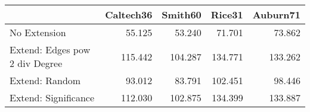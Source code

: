 \begin{tabular}{lrrrr}
\toprule
{} & Caltech36 & Smith60 &  Rice31 & Auburn71 \\
\midrule
No Extension                   &    55.125 &  53.240 &  71.701 &   73.862 \\
Extend: Edges pow 2 div Degree &   115.442 & 104.287 & 134.771 &  133.262 \\
Extend: Random                 &    93.012 &  83.791 & 102.451 &   98.446 \\
Extend: Significance           &   112.030 & 102.875 & 134.399 &  133.887 \\
\bottomrule
\end{tabular}
